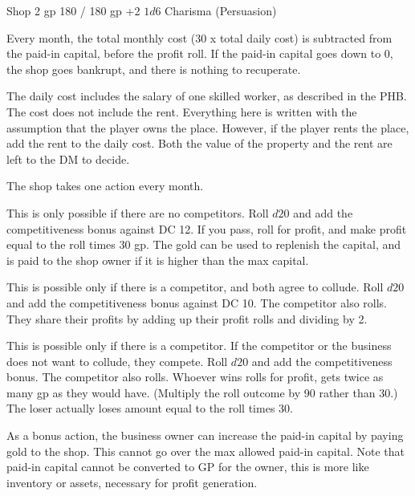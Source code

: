 \documentclass[twocolumn]{dndbook}
\begin{document}
\begin{DndMonster}[width=.5\textwidth - 8pt]{Shop}
	\hfill 2 gp
	\hfill 180 / 180 gp
	\hfill +2
	\hfill $ 1d6 $
	\hfill Charisma (Persuasion)

	Every month, the total monthly cost (30 x total daily cost) is subtracted
	from the paid-in capital, before the profit roll.
	If the paid-in capital goes down to 0, the shop goes bankrupt,
	and there is nothing to recuperate.\par

	The daily cost includes the salary of one skilled worker, as described in the PHB.
	The cost does not include the rent.
	Everything here is written with the assumption that the player owns the place.
	However, if the player rents the place, add the rent to the daily cost.
	Both the value of the property and the rent are left to the DM to decide.\par

	The shop takes one action every month.

	This is only possible if there are no competitors.
	Roll $d20$ and add the competitiveness bonus against DC 12.
	If you pass, roll for profit, and make profit equal to the roll
	times 30 gp. The gold can be used to replenish the capital,
	and is paid to the shop owner if it is higher than the max capital.

	This is possible only if there is a competitor, and both agree to collude.
	Roll $d20$ and add the competitiveness bonus against DC 10.
	The competitor also rolls. They share their profits by adding up
	their profit rolls and dividing by 2.

	This is possible only if there is a competitor. If the competitor
	or the business does not want to collude, they compete.
	Roll $d20$ and add the competitiveness bonus.
	The competitor also rolls.
	Whoever wins rolls for profit, gets twice as many gp as they would have.
	(Multiply the roll outcome by 90 rather than 30.)
	The loser actually loses amount equal to the roll times 30.

	As a bonus action, the business owner can increase
	the paid-in capital by paying gold to the shop.
	This cannot go over the max allowed paid-in capital.
	Note that paid-in capital cannot be converted to GP for the owner,
	this is more like inventory or assets, necessary for profit generation.


\end{DndMonster}
\end{document}
